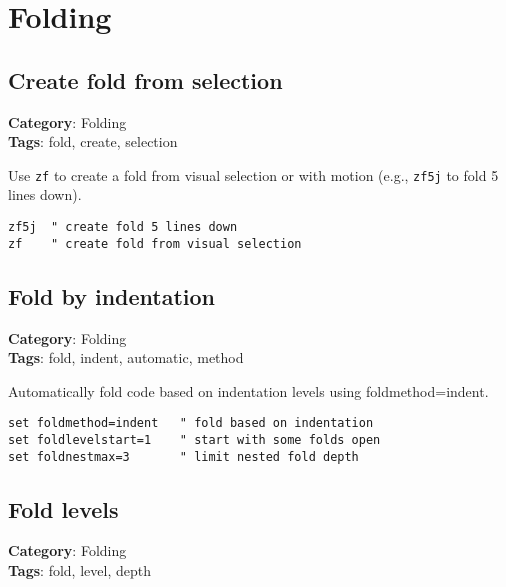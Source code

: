 {{{{{\chapter{Folding}
\section{Create fold from selection}

\textbf{Category}: Folding\\ \textbf{Tags}: fold, create, selection
\vspace{0.5cm}

Use {\footnotesize \Verb§zf§} to create a fold from visual selection or with motion (e.g., {\footnotesize \Verb§zf5j§} to fold 5 lines down).

\begin{Exa*}{}
\begin{Verbatim}[fontsize=\footnotesize, breaklines, breakanywhere]
zf5j  " create fold 5 lines down
zf    " create fold from visual selection
\end{Verbatim}
\end{Exa*}

\section{Fold by indentation}

\textbf{Category}: Folding\\ \textbf{Tags}: fold, indent, automatic, method
\vspace{0.5cm}

Automatically fold code based on indentation levels using foldmethod=indent.

\begin{Exa*}{}
\begin{Verbatim}[fontsize=\footnotesize, breaklines, breakanywhere]
set foldmethod=indent   " fold based on indentation
set foldlevelstart=1    " start with some folds open
set foldnestmax=3       " limit nested fold depth
\end{Verbatim}
\end{Exa*}

\section{Fold levels}

\textbf{Category}: Folding\\ \textbf{Tags}: fold, level, depth
\vspace{0.5cm}

}}}}}
